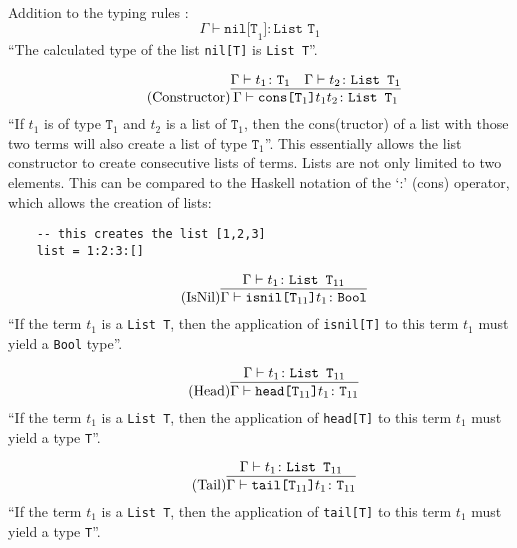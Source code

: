 ~\\
Addition to the typing rules \cite{pierce2002ProgLang}:
\begin{equation*}
    \tag{Nil}
    \Gamma \vdash \texttt{nil[T}_1\texttt{]} \colon \texttt{List T}_1
\end{equation*}
``The calculated type of the list \texttt{nil[T]} is \texttt{List T}''.

\begin{equation*}
    \tag{Constructor}
    \infer{
    \Gamma \vdash \texttt{cons[T}_1 \texttt{]} t_1 t_2 \colon \texttt{List T}_1
    }{
    \Gamma \vdash t_1 \colon \texttt{T}_1 & \Gamma \vdash t_2 \colon \texttt{List T}_1
    }
\end{equation*}
``If $t_1$ is of type $\texttt{T}_1$ and $t_2$ is a list of $\texttt{T}_1$,
then the cons(tructor) of a list with those two terms will also create
a list of type $\texttt{T}_1$''. This essentially allows the list constructor
to create consecutive lists of terms. Lists are not only limited to two elements.
This can be compared to the Haskell notation of the `:' (cons) operator, which
allows the creation of lists:

\begin{verbatim}
    -- this creates the list [1,2,3]
    list = 1:2:3:[]
\end{verbatim}

\begin{equation*}
    \tag{IsNil}
    \infer{
    \Gamma \vdash \texttt{isnil[T}_{11} \texttt{]} t_1 \colon \texttt{Bool}
    }{
    \Gamma \vdash t_1 \colon \texttt{List T}_{11}
    }
\end{equation*}
``If the term $t_1$ is a \texttt{List T}, then the application of
\texttt{isnil[T]} to this term $t_1$ must yield a \texttt{Bool} type''.

\begin{equation*}
    \tag{Head}
    \infer{
    \Gamma \vdash \texttt{head[T}_{11} \texttt{]} t_1 \colon \texttt{T}_{11}
    }{
    \Gamma \vdash t_1 \colon \texttt{List T}_{11}
    }
\end{equation*}
``If the term $t_1$ is a \texttt{List T}, then the application of
\texttt{head[T]} to this term $t_1$ must yield a type \texttt{T}''.

\begin{equation*}
    \tag{Tail}
    \infer{
    \Gamma \vdash \texttt{tail[T}_{11} \texttt{]} t_1 \colon \texttt{T}_{11}
    }{
    \Gamma \vdash t_1 \colon \texttt{List T}_{11}
    }
\end{equation*}
``If the term $t_1$ is a \texttt{List T}, then the application of
\texttt{tail[T]} to this term $t_1$ must yield a type \texttt{T}''.
